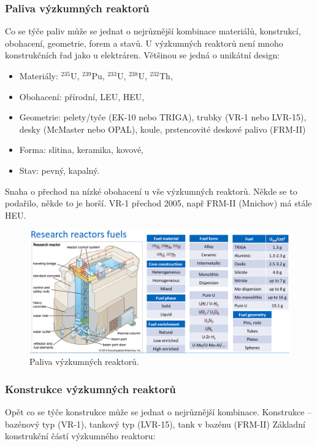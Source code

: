 \subsubsection*{Paliva výzkumných reaktorů}

Co se týče paliv může se jednat o nejrůznější kombinace materiálů, konstrukcí, obohacení, geometrie, forem a stavů. U výzkumných reaktorů není mnoho konstrukčních řad jako u elektráren. Většinou se jedná o unikátní design:

\begin{itemize}
    \item Materiály: $^{235}$U, $^{239}$Pu, $^{233}$U, $^{238}$U, $^{232}$Th,
    \item Obohacení: přírodní, LEU, HEU,
    \item Geometrie: pelety/tyče (EK-10 nebo TRIGA), trubky (VR-1 nebo LVR-15), desky (McMaster nebo OPAL), koule, prstencovité deskové palivo (FRM-II)
    \item Forma: slitina, keramika, kovové,
    \item Stav: pevný, kapalný.
\end{itemize}

Snaha o přechod na nízké obohacení u vše výzkumných reaktorů. Někde se to podařilo, někde to je horší. VR-1 přechod 2005, např FRM-II (Mnichov) má stále HEU.

\begin{figure}[H]
    \centering
    \includegraphics[width=0.75\linewidth]{img/PalivaVýzkumnýchReaktorů.png}
    \caption{Paliva výzkumných reaktorů.}
    \label{fig:enter-label}
\end{figure}

\subsubsection*{Konstrukce výzkumných reaktorů}

Opět co se týče konstrukce může se jednat o nejrůznější kombinace.
Konstrukce -- bazénový typ (VR-1), tankový typ (LVR-15), tank v bazénu (FRM-II)
Základní konstrukční částí výzkumného reaktoru:

